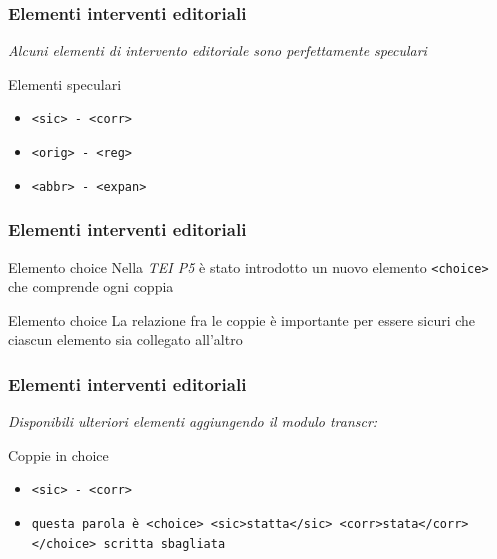  \begin{frame}
    \frametitle{Elementi interventi editoriali}
    \addtocounter{nframe}{1}
    

    \textit{Alcuni elementi di intervento editoriale sono perfettamente speculari}
    \begin{block}{Elementi speculari}
        \begin{itemize}
            \item \texttt{<sic> - <corr>} 
            \item \texttt{<orig> - <reg>}
            \item \texttt{<abbr> - <expan>}
        \end{itemize}
        
    \end{block}
    
\end{frame}

\begin{frame}
    \frametitle{Elementi interventi editoriali}
    \addtocounter{nframe}{1}
    

    \begin{block}{Elemento choice}
        Nella \textit{TEI P5} è stato introdotto un nuovo elemento \texttt{<choice>} che comprende ogni coppia
    \end{block}
    \begin{block}{Elemento choice}
        La relazione fra le coppie è importante per essere sicuri che ciascun elemento sia collegato all’altro
    \end{block}
\end{frame}

\begin{frame}
    \frametitle{Elementi interventi editoriali}
    \addtocounter{nframe}{1}
    
    \textit{Disponibili ulteriori elementi aggiungendo il modulo transcr:}
    \begin{block}{Coppie in choice}
        \begin{itemize}
            \item \texttt{<sic> - <corr>} 
            \item[] \texttt{questa parola è <choice> <sic>statta</sic> <corr>stata</corr> </choice> scritta sbagliata}
        \end{itemize}
        
    \end{block}
    
\end{frame}

